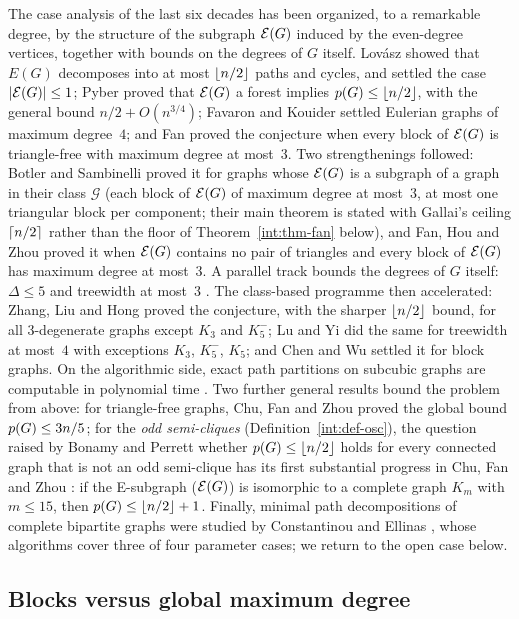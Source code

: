 The case analysis of the last six decades has been organized, to a remarkable degree, by the
structure of the subgraph $\mathcal{E}(G)$ induced by the even-degree vertices, together with bounds
on the degrees of $G$ itself. Lov\'asz \cite{Lo68} showed that $E(G)$ decomposes into at most
$\left\lfloor n/2 \right\rfloor$ paths and cycles, and settled the case $|\mathcal{E}(G)|\le1$; Pyber \cite{Pyb96}
proved that $\mathcal{E}(G)$ a forest implies $p(G)\le\left\lfloor n/2 \right\rfloor$, with the general bound
$n/2+O(n^{3/4})$; Favaron and Kouider \cite{FK88} settled Eulerian graphs of maximum
degree~$4$; and Fan \cite{Fan05} proved the conjecture when every block of $\mathcal{E}(G)$ is
triangle-free with maximum degree at most~$3$. Two strengthenings followed: Botler and
Sambinelli \cite{BS21} proved it for graphs whose $\mathcal{E}(G)$ is a subgraph of a graph in their
class $\mathcal{G}$ (each block of $\mathcal{E}(G)$ of maximum degree at most~$3$, at most one
triangular block per component; their main theorem is stated with Gallai's ceiling
$\left\lceil n/2 \right\rceil$ rather than the floor of Theorem~\ref{int:thm-fan} below), and Fan, Hou and
Zhou \cite{FHZ23} proved it when $\mathcal{E}(G)$ contains no pair of triangles and every block of
$\mathcal{E}(G)$ has maximum degree at most~$3$. A parallel track bounds the degrees of $G$ itself:
$\Delta\le5$ \cite{BP19} and treewidth at most~$3$ \cite{BCLS20}. The class-based programme then accelerated: Zhang, Liu and Hong \cite{ZLH24}
proved the conjecture, with the sharper $\left\lfloor n/2 \right\rfloor$ bound, for all $3$-degenerate graphs
except $K_3$ and $K_5^-$; Lu and Yi \cite{LY24} did the same for treewidth at most~$4$ with
exceptions $K_3$, $K_5^-$, $K_5$; and Chen and Wu \cite{CW25} settled it for block graphs.
On the algorithmic side, exact path partitions on subcubic graphs are computable in
polynomial time \cite{MY26}. Two further general results bound the problem from above: for
triangle-free graphs, Chu, Fan and Zhou \cite{CFZ22} proved the global bound
$p(G)\le 3n/5$; for the \emph{odd semi-cliques} (Definition~\ref{int:def-osc}), the
question raised by Bonamy and Perrett \cite{BP19} whether $p(G)\le\left\lfloor n/2 \right\rfloor$ holds for
every connected graph that is not an odd semi-clique has its first substantial progress in
Chu, Fan and Zhou \cite{CFZ26}: if the E-subgraph ($\mathcal{E}(G)$) is isomorphic to a complete
graph $K_m$ with $m\le15$, then $p(G)\le\left\lfloor n/2 \right\rfloor+1$. Finally, minimal path
decompositions of complete bipartite graphs were studied by Constantinou and Ellinas
\cite{CE18}, whose algorithms cover three of four parameter cases; we return to the open
case below.

\subsection{Blocks versus global maximum degree}\label{int:subsec-blockvsglobal}

